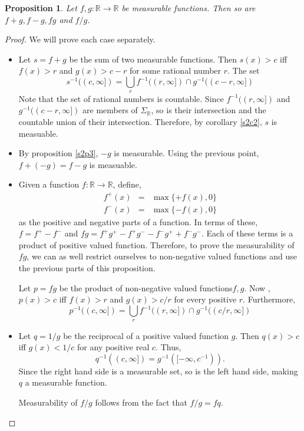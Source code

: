\documentclass{article}
\newcommand{\sor}{\mathbb{R}}
\theoremstyle{plain}
\numberwithin{thm}{section}
\theoremstyle{plain}
\newtheorem{prop}{Proposition}
\numberwithin{prop}{section}
\theoremstyle{definition}
\numberwithin{defn}{section}
\theoremstyle{remark}
\theoremstyle{plain}
\numberwithin{cor}{section}
\numberwithin{equation}{section}
\begin{document}
\begin{prop}\label{s2p6}
Let $f, g: \sor \rightarrow \sor$ be measurable functions. Then so are $f + g,
f - g, fg$ and $f/g$.
\end{prop}
\begin{proof}
We will prove each case separately.
\begin{itemize}
\item Let $s = f + g$ be the sum of two measurable functions. Then $s(x) > c$ 
iff $f(x) > r$ and $g(x) > c - r$ for some rational number $r$. The set
\[
s^{-1}((c, \infty]) = \bigcup_r f^{-1}((r, \infty]) \cap g^{-1}((c - r, \infty])
\]
Note that the set of rational numbers is countable. Since $f^{-1}((r, \infty])$
and $g^{-1}((c - r, \infty])$ are members of $\Sigma_\sor$, so is their 
intersection and the countable union of their intersection. Therefore, by 
corollary \ref{s2c2}, $s$ is measuable.

\item By proposition \ref{s2p3}, $-g$ is measurable. Using the previous point,
$f + (-g) = f - g$ is measuable.

\item Given a function $f: \sor \rightarrow \sor$, define,
\begin{eqnarray*}
f^+(x) &=& \max\{+f(x), 0\} \\
f^-(x) &=& \max\{-f(x), 0\}
\end{eqnarray*}
as the positive and negative parts of a function. In terms of these, $f = f^+
- f^-$ and $fg = f^+g^+ - f^+g^- - f^-g^+ + f^-g^-$. Each of these terms is a
product of positive valued function. Therefore, to prove the measurability of
$fg$, we can as well restrict ourselves to non-negative valued functions and use
the previous parts of this proposition.

Let $p = fg$ be the product of non-negative valued functions$f, g$. Now , $p(x)
> c$ iff $f(x) > r$ and $g(x) > c/r$ for every positive $r$. Furthermore,
\[
p^{-1}((c, \infty]) = \bigcup_r f^{-1}((r, \infty]) \cap g^{-1}((c/r, \infty])
\]

\item Let $q = 1/g$ be the reciprocal of a positive valued function $g$. Then
$q(x) > c$ iff $g(x) < 1/c$ for any positive real $c$. Thus,
\[
q^{-1}((c, \infty]) = g^{-1}([-\infty, c^{-1})).
\]
Since the right hand side is a measurable set, so is the left hand side, making
$q$ a measurable function.

Measurability of $f/g$ follows from the fact that $f/g = fq$.
\end{itemize}
\end{proof}
\end{document}

